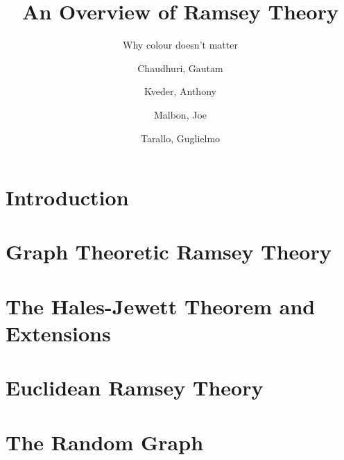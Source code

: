 \documentclass{beamer}
\author{
  Chaudhuri, Gautam\\
  \and
  Kveder, Anthony\\
  \and
  Malbon, Joe\\
  \and
  Tarallo, Guglielmo\\
}
\title{An Overview of Ramsey Theory}
\subtitle{Why colour doesn't matter}
\theoremstyle{BreakBold}
\begin{document}
\frame{\titlepage}

\section{Introduction}

\section{Graph Theoretic Ramsey Theory}

\section{The Hales-Jewett Theorem and Extensions}

\section{Euclidean Ramsey Theory}

\section{The Random Graph}
\end{document}
